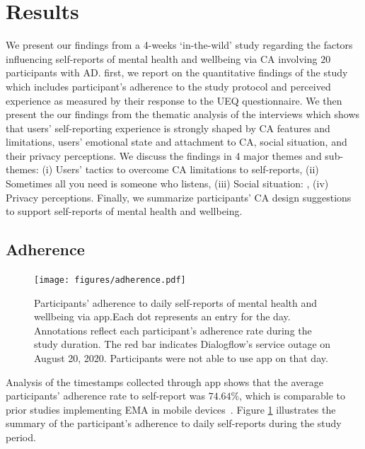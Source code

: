 

\section{Results}
    We present our findings 
    from a 4-weeks `in-the-wild' study 
    regarding the factors influencing self-reports of mental health and wellbeing via \ac{CA} 
    involving $20$ participants with \ac{AD}.
    first, we report on the quantitative findings of the study which includes participant's 
    adherence to the study protocol and perceived experience as measured by their response to the \ac{UEQ} questionnaire. 
    We then present the our findings from the thematic analysis of the interviews which shows that users' self-reporting experience is strongly shaped by
        \ac{CA} features and limitations,
        users' emotional state and attachment to \ac{CA},
        social situation, and
        their privacy perceptions.
    We discuss the findings in 4 major themes and sub-themes:
        (i) Users' tactics to overcome \ac{CA} limitations to self-reports,
        (ii) Sometimes all you need is someone who listens,
        (iii) Social situation: ,
        (iv) Privacy perceptions.
    Finally, we summarize participants' \ac{CA} design suggestions to support self-reports of mental health and wellbeing.

    
    \subsection{Adherence}  
        \begin{figure}
            \centering
            \texttt{[image: figures/adherence.pdf]}
            \caption{Participants' adherence to daily self-reports of mental health and wellbeing via \acl{app}.Each dot represents an entry for the day. Annotations reflect each participant's adherence rate during the study duration. The red bar indicates Dialogflow's service outage on August 20, 2020. Participants were not able to use \acl{app} on that day.}
            \label{fig:adherence}
        \end{figure}
            
        Analysis of the timestamps collected through \acl{app} shows that the average participants' adherence rate to self-report was $74.64\%$, which is comparable to prior studies implementing \ac{EMA} in mobile devices~\cite{wen2017compliance}. Figure \ref{fig:adherence} illustrates the summary of the participant's adherence to daily self-reports during the study period. 
            
